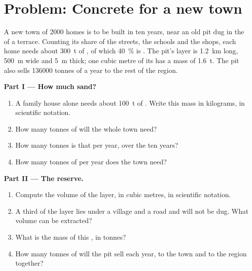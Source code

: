 \section{Problem: Concrete for a new town}

\begin{problem}
\label{pb:g9:earth-resources:1}
A new town of \num{2000} homes is to be built in ten years, near an old
 pit dug in the  of a  terrace. Counting its share of the
streets, the schools and the shops, each home needs about \qty{300}{t} of
, of which \qty{40}{\%} is . The pit's  layer is
\qty{1.2}{km} long, \qty{500}{m} wide and \qty{5}{m} thick; one cubic metre
of its  has a mass of \qty{1.6}{t}. The pit also sells
\num{136000} tonnes of  a year to the rest of the region.

\noindent\textbf{Part I --- How much sand?}\par\nopagebreak
\begin{enumerate}[beginpenalty=10000]
  \item A family house alone needs about \qty{100}{t} of . Write
        this mass in kilograms, in scientific notation.
  \item How many tonnes of  will the whole town need?
  \item How many tonnes is that per year, over the ten years?
  \item How many tonnes of  per year does the town need?
\end{enumerate}

\noindent\textbf{Part II --- The reserve.}\par\nopagebreak
\begin{enumerate}[resume, beginpenalty=10000]
  \item Compute the volume of the  layer, in cubic metres, in
        scientific notation.
  \item A third of the layer lies under a village and a road and will
        not be dug. What volume can be extracted?
  \item What is the mass of this , in tonnes?
  \item How many tonnes of  will the pit sell each year, to the town
        and to the region together?
\end{enumerate}


\end{problem}
